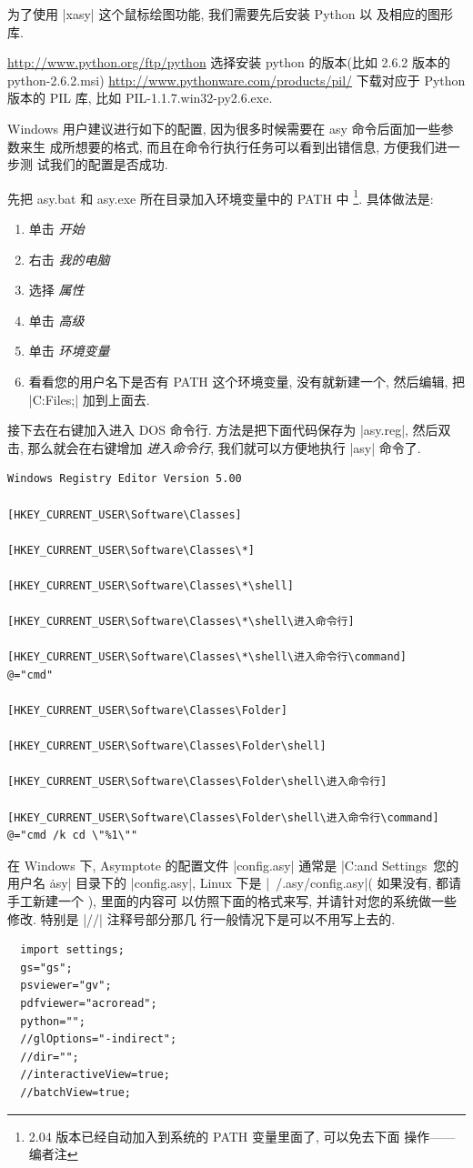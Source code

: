 \documentclass[nofonts,CJKnormalspaces]{ctexbook}[2009/05/20]
\newcommand\transnote[1]{\footnote{#1——编者注}}
\begin{document}
为了使用 |xasy| 这个鼠标绘图功能, 我们需要先后安装 Python 以
及相应的图形库.

\url{http://www.python.org/ftp/python} 选择安装 python 的版本(比如
2.6.2 版本的 python-2.6.2.msi)
\url{http://www.pythonware.com/products/pil/} 下载对应于 Python 版本的
PIL 库, 比如 PIL-1.1.7.win32-py2.6.exe.

Windows 用户建议进行如下的配置, 因为很多时候需要在 asy 命令后面加一些参数来生
成所想要的格式, 而且在命令行执行任务可以看到出错信息, 方便我们进一步测
试我们的配置是否成功.

先把 asy.bat 和 asy.exe 所在目录加入环境变量中的 PATH 中
\transnote{2.04 版本已经自动加入到系统的 PATH 变量里面了, 可以免去下面
  操作}. 具体做法是:
\begin{enumerate}
\item  单击 \emph{开始}
\item 右击 \emph{我的电脑}
\item 选择 \emph{属性}
\item 单击 \emph{高级}
\item 单击 \emph{环境变量}
\item 看看您的用户名下是否有 PATH 这个环境变量, 没有就新建一个, 然后编辑, 把
  |C:\Program Files\Asymptote;| 加到上面去.
\end{enumerate}

接下去在右键加入进入 DOS 命令行.
\label{Windows:DOS}
方法是把下面代码保存为 |asy.reg|, 然后双击, 那么就会在右键增加
\emph{进入命令行}, 我们就可以方便地执行 |asy| 命令了.
\begin{verbatim}
Windows Registry Editor Version 5.00

[HKEY_CURRENT_USER\Software\Classes]

[HKEY_CURRENT_USER\Software\Classes\*]

[HKEY_CURRENT_USER\Software\Classes\*\shell]

[HKEY_CURRENT_USER\Software\Classes\*\shell\进入命令行]

[HKEY_CURRENT_USER\Software\Classes\*\shell\进入命令行\command]
@="cmd"

[HKEY_CURRENT_USER\Software\Classes\Folder]

[HKEY_CURRENT_USER\Software\Classes\Folder\shell]

[HKEY_CURRENT_USER\Software\Classes\Folder\shell\进入命令行]

[HKEY_CURRENT_USER\Software\Classes\Folder\shell\进入命令行\command]
@="cmd /k cd \"%1\""
\end{verbatim}

在 Windows 下, Asymptote 的配置文件 |config.asy| 通常是
|C:\Documents and Settings\ 您的用户名 \.asy| 目录下的 |config.asy|,
Linux 下是 |~/.asy/config.asy|( 如果没有, 都请手工新建一个 ), 里面的内容可
以仿照下面的格式来写, 并请针对您的系统做一些修改. 特别是 |//| 注释号部分那几
行一般情况下是可以不用写上去的.
\begin{lstlisting}
  import settings;
  gs="gs";
  psviewer="gv";
  pdfviewer="acroread";
  python="";
  //glOptions="-indirect";
  //dir="";
  //interactiveView=true;
  //batchView=true;
\end{lstlisting}
\end{document}
